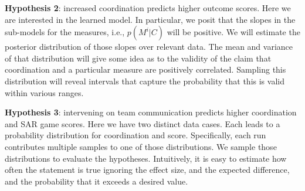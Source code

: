 \textbf{Hypothesis 2}: increased coordination predicts higher outcome scores.
Here we are interested in the learned model. In particular, we posit that the
slopes in the sub-models for the measures, i.e., $p(M^i|C)$ will be positive. We
will estimate the posterior distribution of those slopes over relevant data. The
mean and variance of that distribution will give some idea as to the validity of
the claim that coordination and a particular measure are positively correlated.
Sampling this distribution will reveal intervals that capture the probability
that this is valid within various ranges. 

\textbf{Hypothesis 3}: intervening on team communication predicts higher
coordination and SAR game scores. Here we have two distinct data cases. Each leads to
a probability distribution for coordination and score. Specifically, each run
contributes multiple samples to one of those distributions. We sample those
distributions to evaluate the hypotheses. Intuitively, it is easy to estimate
how often the statement is true ignoring the effect size, and the expected
difference, and the probability that it exceeds a desired value.  


